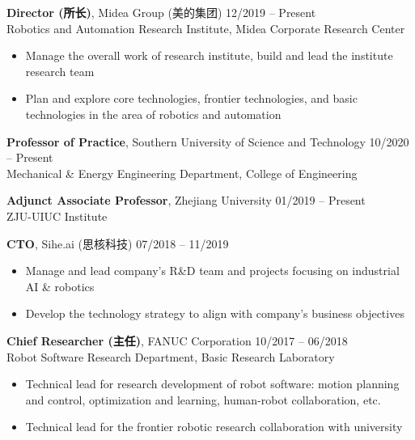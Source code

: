 \documentclass[UTF8,fontset=none]{res}
\begin{document}
\begin{resume}
\begin{list}{}{\setlength\leftmargin{0in}\setlength\topsep{0.15in}}
\item {\bf Director (所长)}, Midea Group (美的集团) \hfill 12/2019 -- Present\\
Robotics and Automation Research Institute, Midea Corporate Research Center
\begin{itemize}
	\item Manage the overall work of research institute, build and lead the institute research team
	\item Plan and explore core technologies, frontier technologies, and basic technologies in the area of robotics and automation
\end{itemize}

\vspace{0.05in}
\item {\bf Professor of Practice}, Southern University of Science and Technology \hfill 10/2020 -- Present\\
Mechanical \& Energy Engineering Department, College of Engineering

\vspace{0.05in}
\item {\bf Adjunct Associate Professor}, Zhejiang University \hfill 01/2019 -- Present\\
ZJU-UIUC Institute

\vspace{0.05in}
\item {\bf CTO}, Sihe.ai (思核科技) \hfill 07/2018 -- 11/2019
\begin{itemize}
	\item Manage and lead company's R\&D team and projects focusing on industrial AI \& robotics
	\item Develop the technology strategy to align with company's business objectives
\end{itemize}

\vspace{0.05in}
\item {\bf Chief Researcher (主任)}, FANUC Corporation \hfill 10/2017 -- 06/2018\\
Robot Software Research Department, Basic Research Laboratory
\begin{itemize}
	\item Technical lead for research development of robot software: motion planning and control, optimization and learning, human-robot collaboration, etc.
	\item Technical lead for the frontier robotic research collaboration with university
\end{itemize}


\end{list}
\end{resume}
\end{document}
